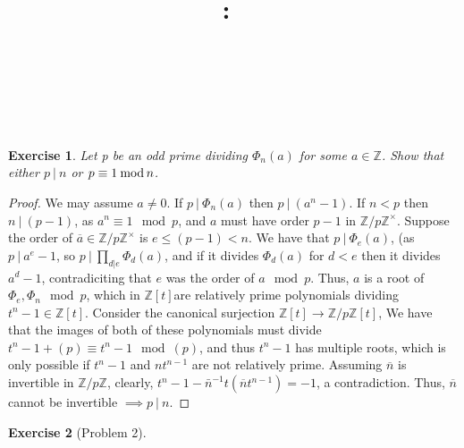 \documentclass{article}
\title{
    \vspace{2in}
    \textmd{\textbf{\hmwkClass:\ \hmwkTitle}}\\
    \vspace{0.1in}
    \textmd{\hmwkDueDate} \\
    \vspace{0.2in}\large{\textit{\hmwkClassInstructor\  }}
    \vspace{2in}
}
\author{\hmwkAuthorName}
\date{}
\newtheorem{exercise}{Exercise}
\begin{document}
\maketitle

\pagebreak

\begin{exercise}
  Let p be an odd prime dividing $\Phi_{n}(a)$ for some $a \in \mathbb{Z}$. Show that either $p \ | \ n$ or $p \equiv 1 \hspace{-0.06in}\mod \hspace{-0.02in}n$.
\end{exercise}

\begin{proof}
  We may assume $a \neq 0$. If $p \ | \ \Phi_{n}(a)$ then $p \ | \ (a^{n}-1)$. If $n < p$ then $n \ | \ (p-1)$, as $a^{n} \equiv 1 \mod p$, and $a$ must have order $p-1$ in $\mathbb{Z}/p\mathbb{Z}^{\times}$. Suppose the order of $\overline a \in \mathbb{Z}/p\mathbb{Z}^{\times}$ is $e \leq (p-1) <  n$. We have that $p \ | \ \Phi_{e}(a)$, (as $p \ | \ a^{e}-1$, so $p \ | \ \prod_{d | e} \Phi_{d}(a)$, and if it divides $\Phi_{d}(a)$ for $d < e$ then it divides $a^{d}-1$, contradiciting that $e$ was the order of $a \mod p$. Thus, $a$ is a root of $\Phi_{e}, \Phi_{n} \mod p$, which in $\mathbb{Z}[t]$are relatively prime polynomials dividing $t^{n}-1 \in \mathbb{Z}[t]$. Consider the canonical surjection $\mathbb{Z}[t] \to \mathbb{Z}/p\mathbb{Z}[t]$, We have that the images of both of these polynomials must divide $t^{n}-1 + (p) \equiv t^{n}-1 \mod (p)$, and thus $t^{n}-1$ has multiple roots, which is only possible if $t^{n}-1$ and $nt^{n-1}$ are not relatively prime. Assuming $\overline n$ is invertible in $\mathbb{Z}/p\mathbb{Z}$, clearly, $t^{n}-1 - \bar n^{-1}t(\overline nt^{n-1}) = -1$, a contradiction. Thus, $\overline n$ cannot be invertible $\implies p \ | \ n$.
\end{proof}

\begin{exercise}[Problem 2] 
\end{exercise}
\end{document}
